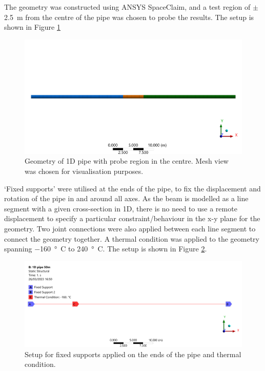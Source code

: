 The geometry was constructed using ANSYS SpaceClaim, and a test region of $\pm$ \SI{2.5}{\meter} from the centre of the pipe was chosen to probe the results. The setup is shown in Figure \ref{part1dSplitBody}
\begin{figure}[H]
    \centering
    \includegraphics[width=\textwidth]{img/part1d-1.png}
    \caption{Geometry of 1D pipe with probe region in the centre. Mesh view was chosen for visualisation purposes.}
    \label{part1dSplitBody}
\end{figure}
`Fixed supports' were utilised at the ends of the pipe, to fix the displacement and rotation of the pipe in and around all axes. As the beam is modelled as a line segment with a given cross-section in 1D, there is no need to use a remote displacement to specify a particular constraint/behaviour in the x-y plane for the geometry. Two joint connections were also applied between each line segment to connect the geometry together. A thermal condition was applied to the geometry spanning \SI{-160}{\degree C} to \SI{240}{\degree C}. The setup is shown in Figure \ref{part1dSupports}.
\begin{figure}[H]
    \centering
    \includegraphics[width = \textwidth]{img/part1d-2.png}
    \caption{Setup for fixed supports applied on the ends of the pipe and thermal condition.}
    \label{part1dSupports}
\end{figure}
